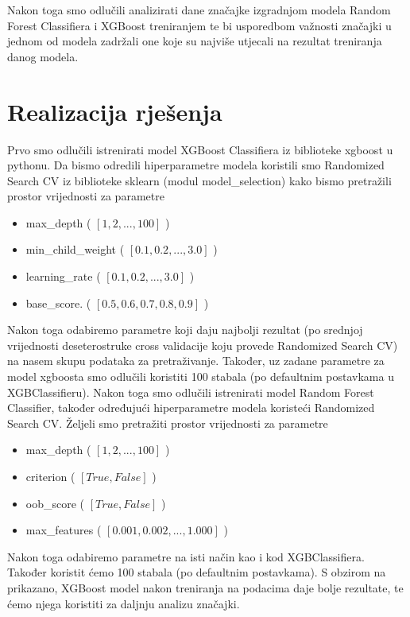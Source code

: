\documentclass[conference]{IEEEtran}
\begin{document}
Nakon toga smo odlučili analizirati dane značajke izgradnjom modela Random Forest Classifiera i XGBoost treniranjem te bi usporedbom važnosti značajki u jednom od modela zadržali one koje su najviše utjecali na rezultat treniranja danog modela.
\section{Realizacija rješenja}
Prvo smo odlučili istrenirati model XGBoost Classifiera iz biblioteke xgboost u pythonu. Da bismo odredili hiperparametre modela koristili smo Randomized Search CV iz biblioteke sklearn (modul model\_selection) kako bismo pretražili prostor vrijednosti za parametre
\begin{itemize} 
\item max\_depth ( $[1, 2,..., 100]$ )
\item min\_child\_weight ( $[0.1, 0.2,..., 3.0]$ )
\item learning\_rate ( $[0.1, 0.2,..., 3.0]$ )
\item base\_score. ( $[0.5, 0.6, 0.7, 0.8, 0.9] $ )
\end{itemize}
Nakon toga odabiremo parametre koji daju najbolji rezultat (po srednjoj vrijednosti deseterostruke cross validacije koju provede Randomized Search CV) na nasem skupu podataka za pretraživanje. Također, uz zadane parametre za model xgboosta smo odlučili koristiti 100 stabala (po defaultnim postavkama u XGBClassifieru).
Nakon toga smo odlučili istrenirati model Random Forest Classifier, također određujući hiperparametre modela koristeći Randomized Search CV. Željeli smo pretražiti prostor vrijednosti za parametre 
\begin{itemize} 
\item max\_depth ( $[1, 2,..., 100]$ )
\item criterion ( $[True, False]$ )
\item oob\_score ( $[True, False]$ )
\item max\_features ( $[0.001, 0.002,..., 1.000] $ )
\end{itemize}
Nakon toga odabiremo parametre na isti način kao i kod XGBClassifiera. Također koristit ćemo 100 stabala (po defaultnim postavkama).
S obzirom na prikazano, XGBoost model nakon treniranja na podacima daje bolje rezultate, te ćemo njega koristiti za daljnju analizu značajki.
\end{document}

